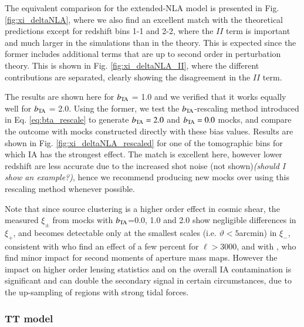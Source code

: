 



The equivalent comparison for the extended-NLA model is presented in Fig. \ref{fig:xi_deltaNLA}, where we also find an excellent match with the theoretical predictions except for redshift bins 1-1 and 2-2, where the $II$ term is important and much larger in the simulations than in the theory. This is expected since the former includes additional terms that are up to second order in perturbation theory. This is shown in Fig. \ref{fig:xi_deltaNLA_II}, where the different contributions are separated, clearly showing the disagreement in  the $II$ term. 

The results are shown here for $b_{\rm TA}$ = 1.0  and we verified that it works equally well for $b_{\rm TA}$ =  2.0. Using the former, we test the $b_{\rm TA}$-rescaling method introduced in Eq. \ref{eq:bta_rescale} to generate $b_{\rm TA}=2.0$ and $b_{\rm TA}=0.0$ mocks, and compare the outcome with mocks constructed directly with these bias values. Results are shown in Fig. \ref{fig:xi_deltaNLA_rescaled} for one of the tomographic bins for which IA has the strongest effect. The match is excellent here, however lower redshift are less accurate due to the increased shot noise (not shown){\it (should I show an example?)}, hence we recommend producing new mocks over using this rescaling method whenever possible. 

Note that since source clustering is a higher order effect in cosmic shear, the measured $\xi_{\pm}$ from mocks with $b_{\rm TA}$=0.0, 1.0 and 2.0 show negligible differences in $\xi_+$, and becomes detectable only at the smallest scales  (i.e. $\vartheta<5$arcmin) in $\xi_-$, consistent with  \citet{source_lens_clustering} who find an effect of a few percent for $\ell>3000$, and with \citet{DESY3_Gatti_source_clust}, who find minor impact for second moments of aperture mass maps. However the impact on higher order lensing statistics and on the overall  IA contamination is significant and can double the secondary signal in certain circumstances, due to the up-sampling of regions with strong tidal forces. 








\subsubsection*{TT model}
\label{subsec:TT}


